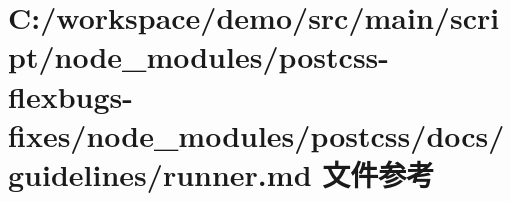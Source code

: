 \hypertarget{postcss-flexbugs-fixes_2node__modules_2postcss_2docs_2guidelines_2runner_8md}{}\section{C\+:/workspace/demo/src/main/script/node\+\_\+modules/postcss-\/flexbugs-\/fixes/node\+\_\+modules/postcss/docs/guidelines/runner.md 文件参考}
\label{postcss-flexbugs-fixes_2node__modules_2postcss_2docs_2guidelines_2runner_8md}
